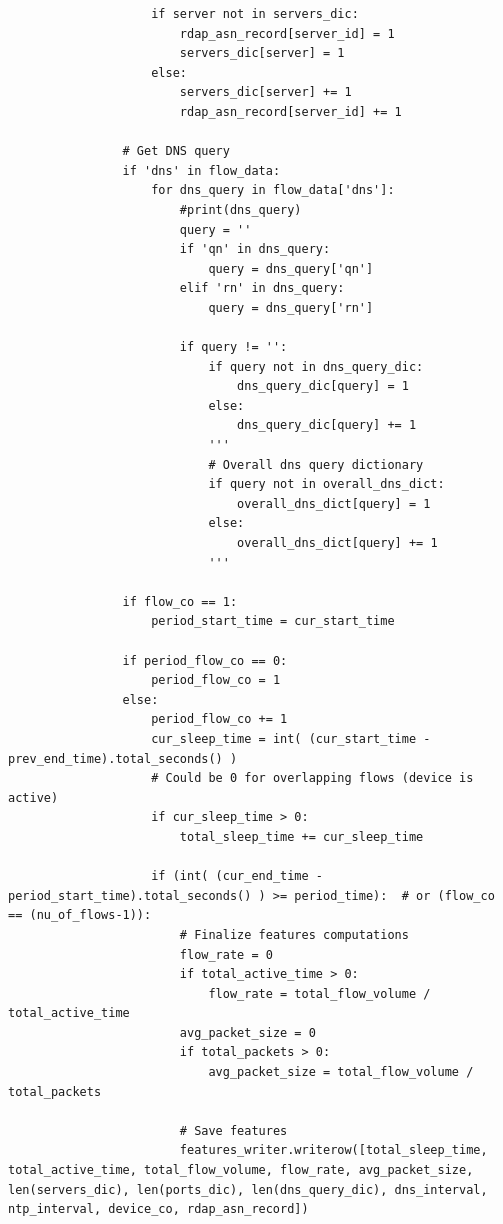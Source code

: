 \documentclass{article}
\begin{document}
\begin{appendices}
\begin{verbatim}
                    if server not in servers_dic:
                        rdap_asn_record[server_id] = 1
                        servers_dic[server] = 1
                    else:
                        servers_dic[server] += 1
                        rdap_asn_record[server_id] += 1
                    
                # Get DNS query
                if 'dns' in flow_data:
                    for dns_query in flow_data['dns']:
                        #print(dns_query)
                        query = ''
                        if 'qn' in dns_query:
                            query = dns_query['qn']
                        elif 'rn' in dns_query:
                            query = dns_query['rn']
                    
                        if query != '':
                            if query not in dns_query_dic:
                                dns_query_dic[query] = 1
                            else:
                                dns_query_dic[query] += 1
                            '''
                            # Overall dns query dictionary
                            if query not in overall_dns_dict:
                                overall_dns_dict[query] = 1
                            else:
                                overall_dns_dict[query] += 1
                            '''

                if flow_co == 1:
                    period_start_time = cur_start_time
            
                if period_flow_co == 0:
                    period_flow_co = 1
                else:
                    period_flow_co += 1
                    cur_sleep_time = int( (cur_start_time - prev_end_time).total_seconds() )
                    # Could be 0 for overlapping flows (device is active)
                    if cur_sleep_time > 0:
                        total_sleep_time += cur_sleep_time

                    if (int( (cur_end_time - period_start_time).total_seconds() ) >= period_time):  # or (flow_co == (nu_of_flows-1)):
                        # Finalize features computations
                        flow_rate = 0
                        if total_active_time > 0:
                            flow_rate = total_flow_volume / total_active_time
                        avg_packet_size = 0
                        if total_packets > 0:
                            avg_packet_size = total_flow_volume / total_packets

                        # Save features
                        features_writer.writerow([total_sleep_time, total_active_time, total_flow_volume, flow_rate, avg_packet_size, len(servers_dic), len(ports_dic), len(dns_query_dic), dns_interval, ntp_interval, device_co, rdap_asn_record])
                    

\end{verbatim}
\end{appendices}
\end{document}
